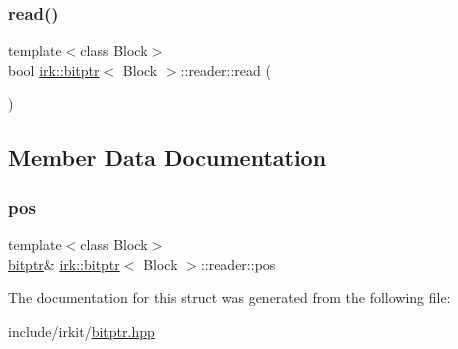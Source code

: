 \subsubsection{\texorpdfstring{read()}{read()}}
{\footnotesize\ttfamily template$<$class Block$>$ \\
bool \mbox{\hyperlink{classirk_1_1bitptr}{irk\+::bitptr}}$<$ Block $>$\+::reader\+::read (\begin{DoxyParamCaption}{ }\end{DoxyParamCaption})\hspace{0.3cm}{\ttfamily [inline]}}



\subsection{Member Data Documentation}
\mbox{\label{structirk_1_1bitptr_1_1reader_af27825b949fe047a40e95730fd7631d3}} 
\subsubsection{\texorpdfstring{pos}{pos}}
{\footnotesize\ttfamily template$<$class Block$>$ \\
\mbox{\hyperlink{classirk_1_1bitptr}{bitptr}}\& \mbox{\hyperlink{classirk_1_1bitptr}{irk\+::bitptr}}$<$ Block $>$\+::reader\+::pos}



The documentation for this struct was generated from the following file\+:\begin{DoxyCompactItemize}
\item 
include/irkit/\mbox{\hyperlink{bitptr_8hpp}{bitptr.\+hpp}}\end{DoxyCompactItemize}
